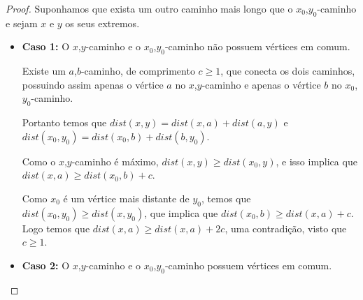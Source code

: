 \documentclass[a4paper,12pt]{article}
\begin{document}
	\begin{proof}
		Suponhamos que exista um outro caminho mais longo que o
		$x_0$,$y_0$-caminho e sejam $x$ e $y$ os seus extremos.

		\begin{itemize}
	        \item \textbf{Caso 1:} O $x$,$y$-caminho e o 
	        $x_0$,$y_0$-caminho não possuem vértices em comum.

	        Existe um $a$,$b$-caminho, de 
	        comprimento $c \ge 1$, que conecta os dois caminhos, 
	        possuindo assim apenas o vértice $a$ no 
	        $x$,$y$-caminho e apenas o vértice $b$ no
	        $x_0$,$y_0$-caminho.

	        \begin{center}  \end{center}


	        Portanto temos que
	        $ dist(x,y) = dist(x,a) + dist(a,y) $ e
	        $ dist(x_0,y_0) = dist(x_0,b) + dist(b,y_0)$.

	        Como o $x$,$y$-caminho é máximo, 
	        $ dist(x,y)\ge dist(x_0,y)$,
	        e isso implica que
	        $ dist(x,a)\ge dist(x_0,b)+c$.

	        Como $x_0$ é um vértice mais distante de $y_0$, temos que 
	        $ dist(x_0,y_0)\ge dist(x,y_0)$, que implica que
	        $ dist(x_0,b)\ge dist(x,a)+c$.
	        Logo temos que
	        $ dist(x,a)\ge dist(x, a)+2c$,
	        uma contradição, visto que
			$c\ge 1$.


			\bigskip
			\bigskip
			\bigskip


			\item \textbf{Caso 2:} O $x$,$y$-caminho e o 
			$x_0$,$y_0$-caminho possuem vértices em comum.


\end{itemize}
\end{proof}
\end{document}
